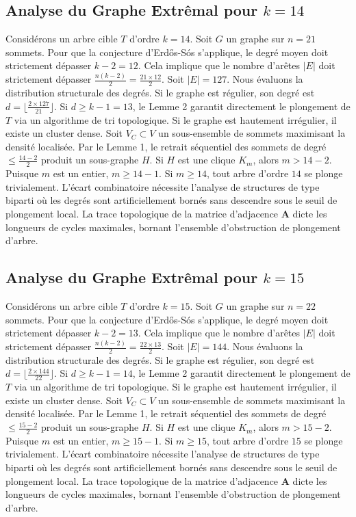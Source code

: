 \documentclass[11pt,a4paper]{article}
\begin{document}
\subsection{Analyse du Graphe Extr\^emal pour $k=14$}
Consid\'erons un arbre cible $T$ d'ordre $k=14$.
Soit $G$ un graphe sur $n=21$ sommets.
Pour que la conjecture d'Erd\H{o}s-S\'os s'applique, le degr\'e moyen doit strictement d\'epasser $k-2 = 12$.
Cela implique que le nombre d'ar\^etes $|E|$ doit strictement d\'epasser $\frac{n(k-2)}{2} = \frac{21 \times 12}{2}$.
Soit $|E| = 127$.
Nous \'evaluons la distribution structurale des degr\'es. Si le graphe est r\'egulier, son degr\'e est $d = \lfloor \frac{2 \times 127}{21} \rfloor$.
Si $d \geq k-1 = 13$, le Lemme 2 garantit directement le plongement de $T$ via un algorithme de tri topologique.
Si le graphe est hautement irr\'egulier, il existe un cluster dense. Soit $V_C \subset V$ un sous-ensemble de sommets maximisant la densit\'e localis\'ee.
Par le Lemme 1, le retrait s\'equentiel des sommets de degr\'e $\leq \frac{14-2}{2}$ produit un sous-graphe $H$.
Si $H$ est une clique $K_{m}$, alors $m > 14-2$. Puisque $m$ est un entier, $m \geq 14-1$. Si $m \geq 14$, tout arbre d'ordre $14$ se plonge trivialement.
L'\'ecart combinatoire n\'ecessite l'analyse de structures de type biparti o\`u les degr\'es sont artificiellement born\'es sans descendre sous le seuil de plongement local. La trace topologique de la matrice d'adjacence $\mathbf{A}$ dicte les longueurs de cycles maximales, bornant l'ensemble d'obstruction de plongement d'arbre.


\subsection{Analyse du Graphe Extr\^emal pour $k=15$}
Consid\'erons un arbre cible $T$ d'ordre $k=15$.
Soit $G$ un graphe sur $n=22$ sommets.
Pour que la conjecture d'Erd\H{o}s-S\'os s'applique, le degr\'e moyen doit strictement d\'epasser $k-2 = 13$.
Cela implique que le nombre d'ar\^etes $|E|$ doit strictement d\'epasser $\frac{n(k-2)}{2} = \frac{22 \times 13}{2}$.
Soit $|E| = 144$.
Nous \'evaluons la distribution structurale des degr\'es. Si le graphe est r\'egulier, son degr\'e est $d = \lfloor \frac{2 \times 144}{22} \rfloor$.
Si $d \geq k-1 = 14$, le Lemme 2 garantit directement le plongement de $T$ via un algorithme de tri topologique.
Si le graphe est hautement irr\'egulier, il existe un cluster dense. Soit $V_C \subset V$ un sous-ensemble de sommets maximisant la densit\'e localis\'ee.
Par le Lemme 1, le retrait s\'equentiel des sommets de degr\'e $\leq \frac{15-2}{2}$ produit un sous-graphe $H$.
Si $H$ est une clique $K_{m}$, alors $m > 15-2$. Puisque $m$ est un entier, $m \geq 15-1$. Si $m \geq 15$, tout arbre d'ordre $15$ se plonge trivialement.
L'\'ecart combinatoire n\'ecessite l'analyse de structures de type biparti o\`u les degr\'es sont artificiellement born\'es sans descendre sous le seuil de plongement local. La trace topologique de la matrice d'adjacence $\mathbf{A}$ dicte les longueurs de cycles maximales, bornant l'ensemble d'obstruction de plongement d'arbre.
\end{document}
